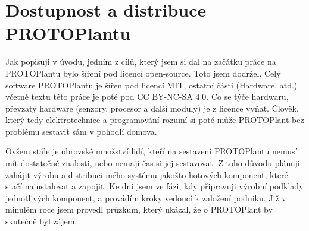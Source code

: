 \chapter{Dostupnost a distribuce PROTOPlantu}
Jak popisuji v úvodu, jedním z cílů, který jsem si dal na začátku práce na PROTOPlantu bylo šíření pod licencí open-source.
Toto jsem dodržel. 
Celý software PROTOPlantu je šířen pod licencí MIT, ostatní části (Hardware, atd.) včetně textu této práce je poté pod CC BY-NC-SA 4.0.
Co se týče hardwaru, převzatý hardware (senzory, procesor a další moduly) je z licence vyňat.
Člověk, který tedy elektrotechnice a programování rozumí si poté může PROTOPlant bez problému sestavit sám v pohodlí domova.

Ovšem stále je obrovské množství lidí, kteří na sestavení PROTOPlantu nemusí mít dostatečné znalosti, nebo nemají čas si jej sestavovat.
Z toho důvodu plánuji zahájit výrobu a distribuci mého systému jakožto hotových komponent, které stačí nainstalovat a zapojit.
Ke dni  jsem ve fázi, kdy připravuji výrobní podklady jednotlivých komponent, a provádím kroky vedoucí k založení podniku.
Již v minulém roce jsem provedl průzkum, který ukázal, že o PROTOPlant by skutečně byl zájem.

\newpage